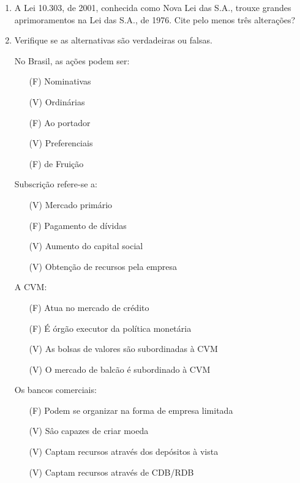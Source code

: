 \documentclass{article}
\begin{document}
\begin{enumerate}
    \item A Lei 10.303, de 2001, conhecida como Nova Lei das S.A., trouxe
        grandes aprimoramentos na Lei das S.A., de 1976. Cite pelo menos três
        alterações?

    \item Verifique se as alternativas são verdadeiras ou falsas.

        No Brasil, as ações podem ser:

        \begin{itemize}
            \item[(F)] Nominativas
            \item[(V)] Ordinárias
            \item[(F)] Ao portador
            \item[(V)] Preferenciais
            \item[(F)] de Fruição
        \end{itemize}

        Subscrição refere-se a:

        \begin{itemize}
            \item[(V)] Mercado primário
            \item[(F)] Pagamento de dívidas
            \item[(V)] Aumento do capital social
            \item[(V)] Obtenção de recursos pela empresa
        \end{itemize}

        A CVM:

        \begin{itemize}
            \item[(F)] Atua no mercado de crédito
            \item[(F)] É órgão executor da política monetária
            \item[(V)] As bolsas de valores são subordinadas à CVM
            \item[(V)] O mercado de balcão é subordinado à CVM
        \end{itemize}

        Os bancos comerciais:

        \begin{itemize}
            \item[(F)] Podem se organizar na forma de empresa limitada
            \item[(V)] Sâo capazes de criar moeda
            \item[(V)] Captam recursos através dos depósitos à vista
            \item[(V)] Captam recursos através de CDB/RDB
        \end{itemize}


\end{enumerate}
\end{document}
